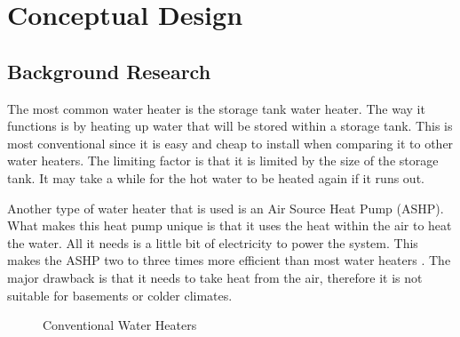 \chapter{Conceptual Design}

\section{Background Research}

The most common water heater is the storage tank water heater. The way it functions is by heating up water that will be stored within a storage tank. This is most conventional since it is easy and cheap to install when comparing it to other water heaters. The limiting factor is that it is limited by the size of the storage tank. It may take a while for the hot water to be heated again if it runs out.

\medskip
Another type of water heater that is used is an Air Source Heat Pump (ASHP). What makes this heat pump unique is that it uses the heat within the air to heat the water. All it needs is a little bit of electricity to power the system. This makes the ASHP two to three times more efficient than most water heaters \cite{heat_pump_water_heaters}. The major drawback is that it needs to take heat from the air, therefore it is not suitable for basements or colder climates.

\begin{figure}[ht]
    \centering
    \qquad
    \caption{Conventional Water Heaters}
\end{figure}

